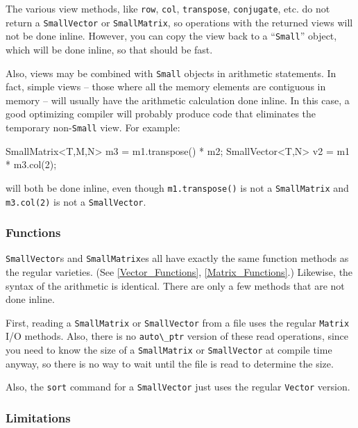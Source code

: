 \documentclass[twoside,letterpaper,11pt]{article}
\renewcommand{\tt}[1]{{\lstinline {#1}}}
\begin{document}
The various view methods, like \tt{row}, \tt{col}, \tt{transpose}, \tt{conjugate}, etc. 
do not return a \tt{SmallVector} or \tt{SmallMatrix}, so operations 
with the returned views will not be done inline.
However, you can copy the view back to a ``\tt{Small}'' object, which will be done 
inline, so that should be fast.

Also, views may be combined with \tt{Small} objects in arithmetic statements.
In fact, simple views -- those where all the memory 
elements are contiguous in memory -- will usually have the arithmetic calculation
done inline.
In this case, a good optimizing compiler will probably produce code that 
eliminates the temporary
non-\tt{Small} view.  For example:
\begin{tmvcode}
SmallMatrix<T,M,N> m3 = m1.transpose() * m2;
SmallVector<T,N> v2 = m1 * m3.col(2);
\end{tmvcode}
will both be done inline, even though \tt{m1.transpose()} is not a \tt{SmallMatrix} and
\tt{m3.col(2)} is not a \tt{SmallVector}.

\subsubsection{Functions}
\label{SmallMatrix_Functions}

\tt{SmallVector}s and \tt{SmallMatrix}es all have exactly the same
function methods as the regular varieties.  
(See \ref{Vector_Functions}, \ref{Matrix_Functions}.)
Likewise, the syntax of the
arithmetic is identical.  There are only a few methods that 
are not done inline.  

First, reading a \tt{SmallMatrix} or \tt{SmallVector} from a file 
uses the regular
\tt{Matrix} I/O methods.  Also, there is no \tt{auto\_ptr} 
version of these read operations, since you need to know the 
size of a \tt{SmallMatrix} or \tt{SmallVector} at compile time anyway, 
so there is no way to wait until the file is read to determine the size.

Also, the \tt{sort} command for a \tt{SmallVector} just uses the
regular \tt{Vector} version.

\subsubsection{Limitations}
\label{SmallMatrix_Limitations}
\end{document}
